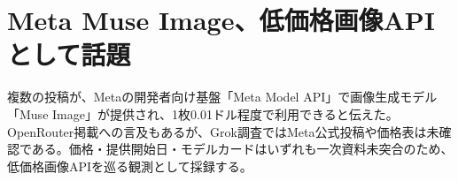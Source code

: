 \section{Meta Muse Image、低価格画像APIとして話題}
複数の投稿が、Metaの開発者向け基盤「Meta Model API」で画像生成モデル「Muse Image」が提供され、1枚0.01ドル程度で利用できると伝えた。OpenRouter掲載への言及もあるが、Grok調査ではMeta公式投稿や価格表は未確認である。価格・提供開始日・モデルカードはいずれも一次資料未突合のため、低価格画像APIを巡る観測として採録する。
